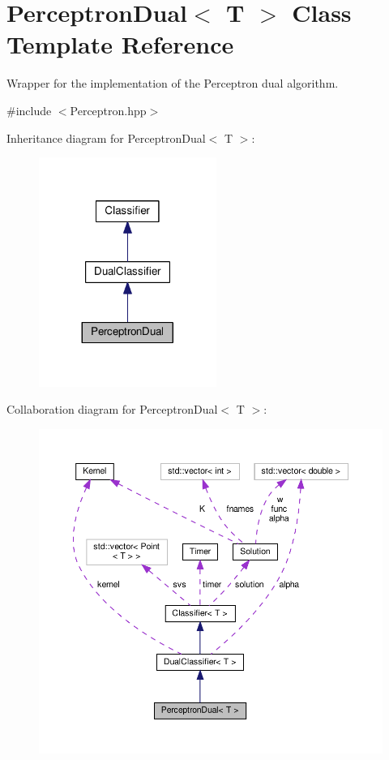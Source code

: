 \hypertarget{class_perceptron_dual}{}\section{Perceptron\+Dual$<$ T $>$ Class Template Reference}
\label{class_perceptron_dual}


Wrapper for the implementation of the Perceptron dual algorithm.  




{\ttfamily \#include $<$Perceptron.\+hpp$>$}



Inheritance diagram for Perceptron\+Dual$<$ T $>$\+:\nopagebreak
\begin{figure}[H]
\begin{center}
\leavevmode
\includegraphics[width=164pt]{class_perceptron_dual__inherit__graph}
\end{center}
\end{figure}


Collaboration diagram for Perceptron\+Dual$<$ T $>$\+:
\nopagebreak
\begin{figure}[H]
\begin{center}
\leavevmode
\includegraphics[width=350pt]{class_perceptron_dual__coll__graph}
\end{center}
\end{figure}
